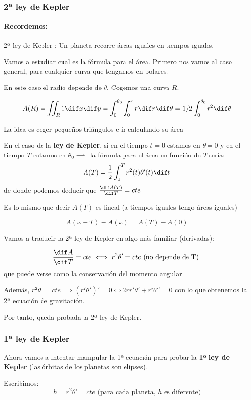 \subsubsection{2ª ley de Kepler}
\paragraph{Recordemos:}
2ª ley de Kepler : Un planeta recorre áreas iguales en tiempos iguales.

Vamos a estudiar cual es la fórmula para el área.
Primero nos vamos al caso general, para cualquier curva que tengamos en polares.

En este caso el radio depende de $\theta$. Cogemos una curva $R$.

$$A(R) = \iint_R 1 \dif x \dif y = \int_0^{\theta_0} \int_0^r r \dif r \dif \theta = 1/2 \int_0^{\theta_0} r^2\dif\theta$$

La idea es coger pequeños triángulos e ir calculando su área

En el caso de la \textbf{ley de Kepler}, si en el tiempo $t=0$ estamos en $\theta = 0$ y en el tiempo $T$ estamos en $\theta_0 \implies$ la fórmula para el área en función de $T$ sería: \[ A(T) = \frac{1}{2} \int_1^T r^2(t) \theta'(t) \dif t \] de donde podemos deducir que $\frac {\dif A(T)}{\dif T} = cte$

Es lo mismo que decir $A(T)$ es lineal (a tiempos iguales tengo áreas iguales)

\[A(x + T) - A(x) = A(T) - A(0)\]

Vamos a traducir la 2ª ley de Kepler en algo más familiar (derivadas):

\[\frac{\dif A}{\dif T} = cte \iff r^2\theta' = cte  \text{ (no depende de T) }\]
que puede verse como la conservación del momento angular

Además, $r^2\theta' = cte  \implies (r^2\theta')' = 0 \iff 2rr'\theta' + r²\theta'' =0$ con lo que obtenemos la 2ª ecuación de gravitación.

Por tanto, queda probada la 2ª ley de Kepler.

\subsubsection{1ª ley de Kepler}
Ahora vamos a intentar manipular la 1ª ecuación para probar la \textbf{1ª ley de Kepler} (las órbitas de los planetas son elipses).

Escribimos:
\[h= r^2\theta'=cte \text{ (para cada planeta, } h \text{ es diferente)}\]

